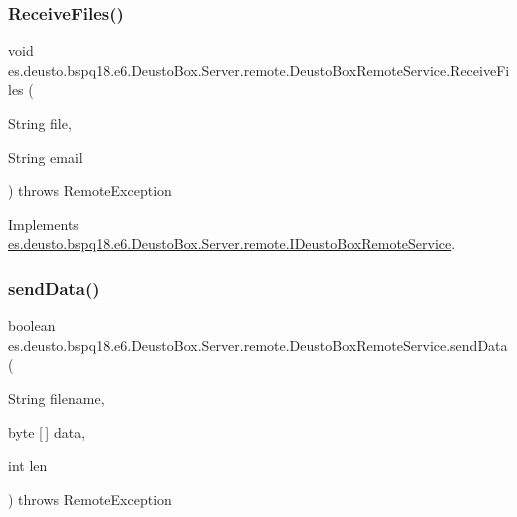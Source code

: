\subsubsection{\texorpdfstring{Receive\+Files()}{ReceiveFiles()}}
{\footnotesize\ttfamily void es.\+deusto.\+bspq18.\+e6.\+Deusto\+Box.\+Server.\+remote.\+Deusto\+Box\+Remote\+Service.\+Receive\+Files (\begin{DoxyParamCaption}\item[{String}]{file,  }\item[{String}]{email }\end{DoxyParamCaption}) throws Remote\+Exception}



Implements \mbox{\hyperlink{interfacees_1_1deusto_1_1bspq18_1_1e6_1_1_deusto_box_1_1_server_1_1remote_1_1_i_deusto_box_remote_service_aac41850e4367aa1213777b0e9ea3c213}{es.\+deusto.\+bspq18.\+e6.\+Deusto\+Box.\+Server.\+remote.\+I\+Deusto\+Box\+Remote\+Service}}.

\mbox{\label{classes_1_1deusto_1_1bspq18_1_1e6_1_1_deusto_box_1_1_server_1_1remote_1_1_deusto_box_remote_service_aeeafed7d44048979f7d349f38300fc82}} 
\subsubsection{\texorpdfstring{send\+Data()}{sendData()}}
{\footnotesize\ttfamily boolean es.\+deusto.\+bspq18.\+e6.\+Deusto\+Box.\+Server.\+remote.\+Deusto\+Box\+Remote\+Service.\+send\+Data (\begin{DoxyParamCaption}\item[{String}]{filename,  }\item[{byte \mbox{[}$\,$\mbox{]}}]{data,  }\item[{int}]{len }\end{DoxyParamCaption}) throws Remote\+Exception}



